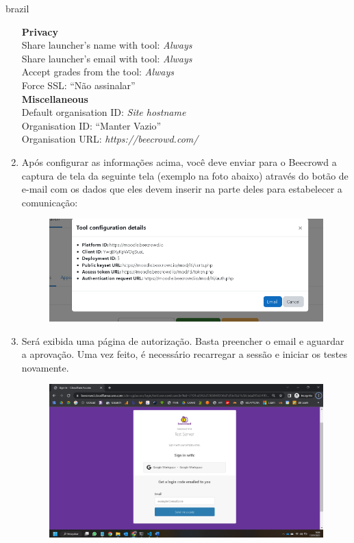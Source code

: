 \begin{otherlanguage*}{brazil}
\begin{enumerate}
    \textbf{Privacy} \\
    Share launcher's name with tool: \textit{Always} \\
    Share launcher's email with tool: \textit{Always} \\
    Accept grades from the tool: \textit{Always} \\
    Force SSL: “Não assinalar” \\
    
    \textbf{Miscellaneous} \\
    Default organisation ID:  \textit{Site hostname} \\
    Organisation ID: “Manter Vazio” \\
    Organisation URL: \textit{https://beecrowd.com/} \\
    

    \item Após configurar as informações acima, você deve enviar para o Beecrowd a captura de tela da seguinte tela (exemplo na foto abaixo) através do botão de e-mail com os dados que eles devem inserir na parte deles para estabelecer a comunicação:
    
    \begin{figure}[h!]
        \centering
            \includegraphics[scale=0.4]{pictures/apendices/apendice_a_5.png}
    \end{figure}
    
    \item Será exibida uma página de autorização. Basta preencher o email e aguardar a aprovação. Uma vez feito, é necessário recarregar a sessão e iniciar os testes novamente.

    \begin{figure}[h!]
        \centering
            \includegraphics[scale=0.4]{pictures/apendices/apendice_a_6.png}
    \end{figure}


\end{enumerate}
\end{otherlanguage*}
